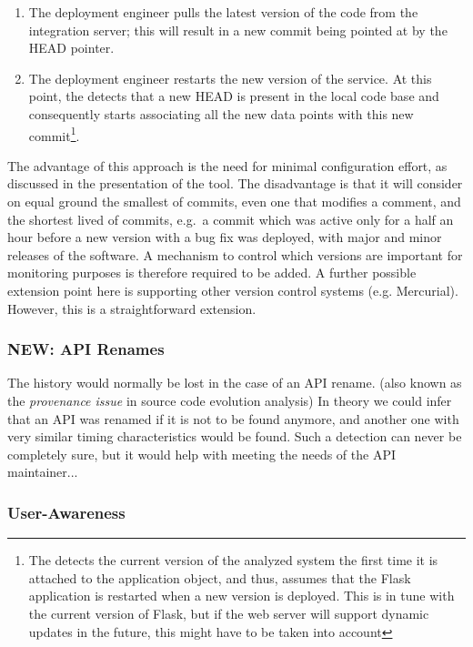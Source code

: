   \begin{enumerate}
    \item The deployment engineer pulls the latest version of the code from the integration server; this will result in a new commit being pointed at by the HEAD pointer. %
    \item The deployment engineer restarts the new version of the service. At this point, the \tool detects that a new HEAD is present in the local code base and consequently starts associating all the new data points with this new commit\footnote{The \tool detects the current version of the analyzed system the first time it is attached to the application object, and thus, assumes that the Flask application is restarted when a new version is deployed. This is in tune with the current version of Flask, but if the web server will support dynamic updates in the future, this might have to be taken into account}.
  \end{enumerate}

  The advantage of this approach is the need for minimal configuration effort, as discussed in the presentation of the tool. The disadvantage is that it will consider on equal ground the smallest of commits, even one that modifies a comment, and the shortest lived of commits, e.g.~a commit which was active only for a half an hour before a new version with a bug fix was deployed, with major and minor releases of the software. %
  A mechanism to control which versions are important for monitoring purposes is therefore required to be added.
%
  A further possible extension point here is supporting other version control systems (e.g. Mercurial). However, this is a straightforward extension.

  \subsubsection{NEW: API Renames}


    The history would normally be lost in the case of an API rename. (also known as the {\em provenance issue} in source code evolution analysis)
    In theory we could infer that an API was renamed if it is not to be found anymore, and another one with very similar timing characteristics would be found. Such a detection can never be completely sure, but it would help with meeting the needs of the API maintainer... 

  \subsubsection{User-Awareness }

